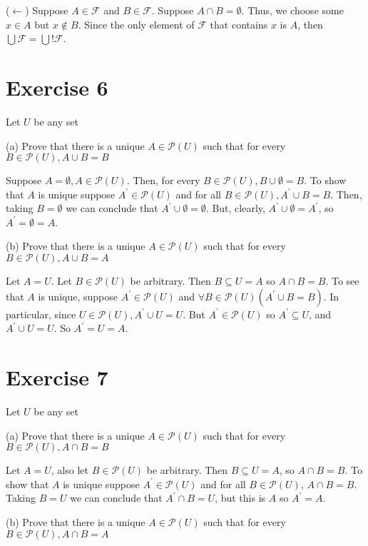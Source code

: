 \documentclass[11pt]{article}
\newcommand{\powerset}[1]{\mathscr{P}(#1)}
\newcommand{\family}[1]{\mathcal{#1}}
\begin{document}
($\leftarrow$) Suppose $A \in \family{F}$ and $B \in \family{F}$. Suppose 
$A \cap B = \emptyset$. Thus, we choose some $x \in A$ but $x \notin B$. 
Since the only element of $\family{F}$ that contains $x$ is $A$, then 
$\bigcup \family{F} = \bigcup! \family{F}$.

\section*{Exercise 6}

Let $U$ be any set

\noindent (a) Prove that there is a unique $A \in \powerset{U}$ such that for 
every $B \in \powerset{U}, A \cup B = B$

Suppose $A = \emptyset, A \in \powerset{U}$. Then, for every $B \in \powerset{U},
B \cup \emptyset = B$. To show that $A$ is unique suppose 
$A^\prime \in \powerset{U}$ and for all $B \in \powerset{U}, A^\prime \cup B = B$.
Then, taking $B = \emptyset$ we can conclude that 
$A^\prime \cup \emptyset = \emptyset$. But, clearly, 
$A^\prime \cup \emptyset = A^\prime$, so $A^\prime = \emptyset = A$.

\noindent (b) Prove that there is a unique $A \in \powerset{U}$ such that for 
every $B \in \powerset{U}, A \cup B = A$

Let $A = U$. Let $B \in \powerset{U}$ be arbitrary. Then $B \subseteq U = A$ so 
$A \cap B = B$. To see that $A$ is unique, suppose $A^\prime \in \powerset{U}$
and $\forall B \in \powerset{U} (A^\prime \cup B = B)$. In particular,
since $U \in \powerset{U}, A^\prime \cup U = U$. But $A^\prime \in \powerset{U}$
so $A^\prime \subseteq U$, and $A^\prime \cup U = U$. So $A^\prime = U = A$.

\section*{Exercise 7}

Let $U$ be any set 

\noindent (a) Prove that there is a unique $A \in \powerset{U}$ such that for 
every $B \in \powerset{U}, A \cap B = B$

Let $A = U$, also let $B \in \powerset{U}$ be arbitrary. Then $B \subseteq U = A$,
so $A \cap B = B$. To show that $A$ is unique suppose $A^\prime \in \powerset{U}$
and for all $B \in \powerset{U}$, $A \cap B = B$. Taking $B = U$ we can conclude 
that $A^\prime \cap B = U$, but this is $A$ so $A^\prime = A$.

\noindent (b) Prove that there is a unique $A \in \powerset{U}$ such that for 
every $B \in \powerset{U}, A \cap B = A$
\end{document}
